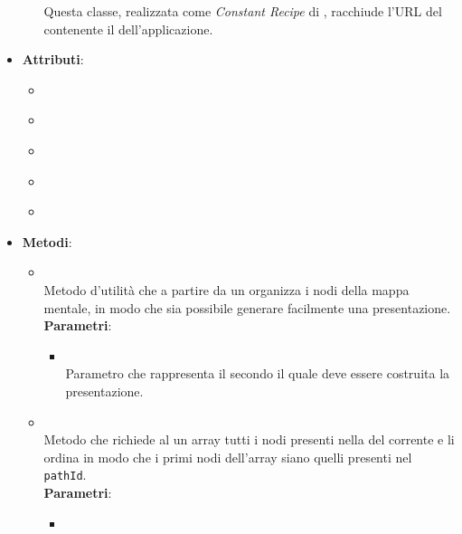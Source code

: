 \begin{itemize}
\begin{itemize}
Questa classe, realizzata come \textit{Constant Recipe} di , racchiude l'URL del  contenente il  dell'applicazione.
\end{itemize}
\item \textbf{Attributi}:
\begin{itemize}
\item {}
\\ \dpPathServiceField
\item {}
\\ \dpProjectServiceField
\item {}
\\ \dpConstantServiceField
\item {}
\\ \dpHttpField
\item {}
\\ \dpQField
\end{itemize}
\item \textbf{Metodi}:
\begin{itemize}
\item {}
\\ Metodo d'utilità che a partire da un  organizza i nodi della mappa mentale, in modo che sia possibile generare facilmente una presentazione.
\\ \textbf{Parametri}:
\begin{itemize}
\item {}
\\ Parametro che rappresenta il  secondo il quale deve essere costruita la presentazione.
\end{itemize}
\item {}
\\ Metodo che richiede al  un array tutti i nodi presenti nella  del  corrente e li ordina in modo che i primi nodi dell'array siano quelli presenti nel  \texttt{pathId}.
\\ \textbf{Parametri}:
\begin{itemize}
\item {}

\end{itemize}
\end{itemize}
\end{itemize}
